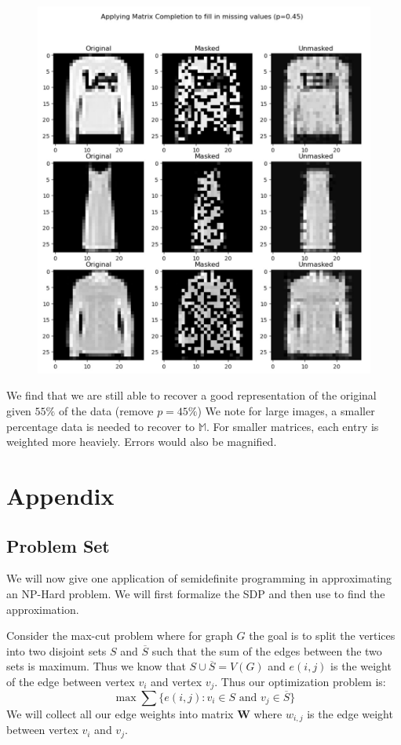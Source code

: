 \documentclass{article}
\begin{document}
\begin{figure}[htb]
  \centering
  \includegraphics[scale=.25]{assets/mc-r1.jpg}
\end{figure}

We find that we are still able to recover a good representation of the original given $55\%$ of the data (remove $p = 45\%$)
We note for large images, a smaller percentage data is needed to recover to $\mathbb{M}$.
For smaller matrices, each entry is weighted more heaviely. Errors would also be magnified. 

\newpage
\section{Appendix}
\subsection{Problem Set}
We will now give one application of semidefinite programming in approximating an NP-Hard problem.
We will first formalize the SDP and then use to find the approximation.

Consider the max-cut problem where for graph \( G \) the goal is to split the vertices into two disjoint sets \( S \) and \( \overline{S} \) such that the sum of the edges between the two sets is maximum.
Thus we know that \( S \cup \overline{S} = V(G) \) and \( e(i, j) \) is the weight of the edge between vertex \( v_i \) and vertex \( v_j \).
Thus our optimization problem is:
\[
  \max \sum \{ e(i, j): v_i \in S \text{ and } v_j \in \overline{S} \}
\]
We will collect all our edge weights into matrix \( \mathbf{W} \) where \( w_{i, j} \) is the edge weight between vertex \( v_i \) and \( v_j \).
\end{document}
